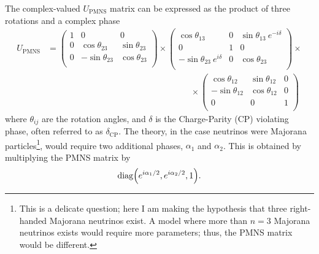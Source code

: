 The complex-valued $U_\mathrm{PMNS}$ matrix can be expressed as the product of three rotations and a complex phase \begin{equation}
    \begin{aligned}
        U_\mathrm{PMNS} &= \begin{pmatrix}
            1 & 0 & 0\\
            0 & \cos\theta_{23} & \sin\theta_{23} \\
            0 & -\sin\theta_{23} & \cos\theta_{23} \\
        \end{pmatrix} \times \begin{pmatrix}
            \cos\theta_{13} & 0 & \sin\theta_{13}\ e^{-i\delta} \\
            0 & 1 & 0\\
            -\sin\theta_{23}\ e^{i\delta} & 0 & \cos\theta_{23} \\
        \end{pmatrix} \times\\ 
        &\hspace{7cm}\times \begin{pmatrix}
            \cos\theta_{12} & \sin\theta_{12} & 0\\
            -\sin\theta_{12} & \cos\theta_{12} & 0\\
            0 & 0 & 1\\
        \end{pmatrix}
    \end{aligned} \label{eq:PMNS}
\end{equation} where $\theta_{ij}$ are the rotation angles, and $\delta$ is the Charge-Parity (CP) violating phase, often referred to as $\delta_\mathrm{CP}$. The theory, in the case neutrinos were Majorana particles\footnote{This is a delicate question; here I am making the hypothesis that three right-handed Majorana neutrinos exist. A model where more than $n=3$ Majorana neutrinos exists would require more parameters; thus, the PMNS matrix would be different.}, would require two additional phases, $\alpha_1$ and $\alpha_2$. This is obtained by multiplying the PMNS matrix by \[\mathrm{diag}\qty(e^{i\alpha_1/2}, e^{i\alpha_2/2}, 1).\]

